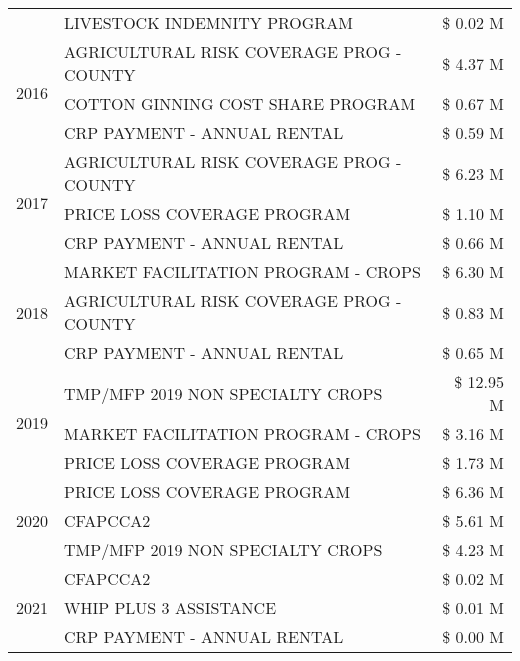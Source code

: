 \begin{tabular}{llr}
 & LIVESTOCK INDEMNITY PROGRAM & \$ 0.02 M \\
\cline{1-3}
\multirow[t]{3}{*}{2016} & AGRICULTURAL RISK COVERAGE PROG - COUNTY & \$ 4.37 M \\
 & COTTON GINNING COST SHARE PROGRAM & \$ 0.67 M \\
 & CRP PAYMENT - ANNUAL RENTAL & \$ 0.59 M \\
\cline{1-3}
\multirow[t]{3}{*}{2017} & AGRICULTURAL RISK COVERAGE PROG - COUNTY & \$ 6.23 M \\
 & PRICE LOSS COVERAGE PROGRAM & \$ 1.10 M \\
 & CRP PAYMENT - ANNUAL RENTAL & \$ 0.66 M \\
\cline{1-3}
\multirow[t]{3}{*}{2018} & MARKET FACILITATION PROGRAM - CROPS & \$ 6.30 M \\
 & AGRICULTURAL RISK COVERAGE PROG - COUNTY & \$ 0.83 M \\
 & CRP PAYMENT - ANNUAL RENTAL & \$ 0.65 M \\
\cline{1-3}
\multirow[t]{3}{*}{2019} & TMP/MFP 2019 NON SPECIALTY CROPS & \$ 12.95 M \\
 & MARKET FACILITATION PROGRAM - CROPS & \$ 3.16 M \\
 & PRICE LOSS COVERAGE PROGRAM & \$ 1.73 M \\
\cline{1-3}
\multirow[t]{3}{*}{2020} & PRICE LOSS COVERAGE PROGRAM & \$ 6.36 M \\
 & CFAPCCA2 & \$ 5.61 M \\
 & TMP/MFP 2019 NON SPECIALTY CROPS & \$ 4.23 M \\
\cline{1-3}
\multirow[t]{3}{*}{2021} & CFAPCCA2 & \$ 0.02 M \\
 & WHIP PLUS 3 ASSISTANCE & \$ 0.01 M \\
 & CRP PAYMENT - ANNUAL RENTAL & \$ 0.00 M \\
\cline{1-3}
\bottomrule
\end{tabular}
